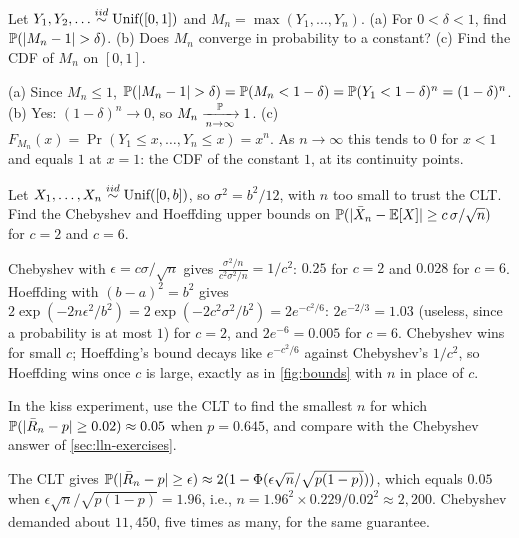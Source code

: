 \begin{exercise}
Let $Y_1, Y_2, \ldots \stackrel{iid}{\sim} \text{Unif}([0,1])$ and $M_n = \max(Y_1, \ldots, Y_n)$. (a) For $0 < \delta < 1$, find $\mathbb{P}(\lvert M_n - 1\rvert > \delta)$. (b) Does $M_n$ converge in probability to a constant? (c) Find the CDF of $M_n$ on $[0,1]$.
\end{exercise}
\begin{solution}
(a) Since $M_n \leq 1$, $\mathbb{P}(\lvert M_n - 1\rvert > \delta) = \mathbb{P}(M_n < 1 - \delta) = \mathbb{P}(Y_1 < 1 - \delta)^n = (1 - \delta)^n$. (b) Yes: $(1-\delta)^n \to 0$, so $M_n \xrightarrow [n \to \infty ]{\mathbb{P}} 1$. (c) $F_{M_n}(x) = \Pr(Y_1 \leq x, \ldots, Y_n \leq x) = x^n$. As $n \to \infty$ this tends to $0$ for $x < 1$ and equals $1$ at $x = 1$: the CDF of the constant $1$, at its continuity points.
\end{solution}

\begin{exercise}
Let $X_1, \ldots, X_n \stackrel{iid}{\sim} \text{Unif}([0, b])$, so $\sigma^2 = b^2/12$, with $n$ too small to trust the CLT. Find the Chebyshev and Hoeffding upper bounds on $\mathbb{P}(\lvert\bar{X}_n - \operatorname*{\mathbb{E}}[X]\rvert \geq c\,\sigma/\sqrt{n})$ for $c = 2$ and $c = 6$.
\end{exercise}
\begin{solution}
Chebyshev with $\epsilon = c\sigma/\sqrt{n}$ gives $\frac{\sigma^2/n}{c^2 \sigma^2/n} = 1/c^2$: $0.25$ for $c = 2$ and $0.028$ for $c = 6$. Hoeffding with $(b - a)^2 = b^2$ gives $2\exp(-2n\epsilon^2/b^2) = 2\exp(-2c^2\sigma^2/b^2) = 2 e^{-c^2/6}$: $2e^{-2/3} = 1.03$ (useless, since a probability is at most $1$) for $c = 2$, and $2e^{-6} = 0.005$ for $c = 6$. Chebyshev wins for small $c$; Hoeffding's bound decays like $e^{-c^2/6}$ against Chebyshev's $1/c^2$, so Hoeffding wins once $c$ is large, exactly as in \cref{fig:bounds} with $n$ in place of $c$.
\end{solution}

\begin{exercise}
In the kiss experiment, use the CLT to find the smallest $n$ for which $\mathbb{P}(\lvert\bar{R}_n - p\rvert \geq 0.02) \approx 0.05$ when $p = 0.645$, and compare with the Chebyshev answer of \cref{sec:lln-exercises}.
\end{exercise}
\begin{solution}
The CLT gives $\mathbb{P}(\lvert\bar{R}_n - p\rvert \geq \epsilon) \approx 2(1 - \Phi(\epsilon\sqrt{n}/\sqrt{p(1-p)}))$, which equals $0.05$ when $\epsilon \sqrt{n}/\sqrt{p(1-p)} = 1.96$, i.e., $n = 1.96^2 \times 0.229/0.02^2 \approx 2{,}200$. Chebyshev demanded about $11{,}450$, five times as many, for the same guarantee.
\end{solution}

